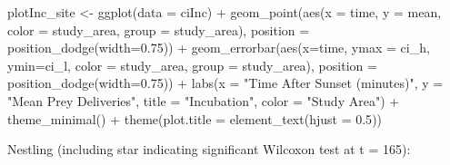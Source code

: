 \documentclass[
]{article}
\newenvironment{Shaded}{\begin{snugshade}}{\end{snugshade}}
\newcommand{\AttributeTok}[1]{\textcolor[rgb]{0.77,0.63,0.00}{#1}}
\newcommand{\FloatTok}[1]{\textcolor[rgb]{0.00,0.00,0.81}{#1}}
\newcommand{\FunctionTok}[1]{\textcolor[rgb]{0.00,0.00,0.00}{#1}}
\newcommand{\NormalTok}[1]{#1}
\newcommand{\OtherTok}[1]{\textcolor[rgb]{0.56,0.35,0.01}{#1}}
\newcommand{\SpecialCharTok}[1]{\textcolor[rgb]{0.00,0.00,0.00}{#1}}
\newcommand{\StringTok}[1]{\textcolor[rgb]{0.31,0.60,0.02}{#1}}
\begin{document}
\begin{Shaded}
\begin{Highlighting}[]
\NormalTok{plotInc\_site }\OtherTok{\textless{}{-}} \FunctionTok{ggplot}\NormalTok{(}\AttributeTok{data =}\NormalTok{ ciInc) }\SpecialCharTok{+}
  \FunctionTok{geom\_point}\NormalTok{(}\FunctionTok{aes}\NormalTok{(}\AttributeTok{x =}\NormalTok{ time, }\AttributeTok{y =}\NormalTok{ mean, }\AttributeTok{color =}\NormalTok{ study\_area, }\AttributeTok{group =}\NormalTok{ study\_area),}
             \AttributeTok{position =} \FunctionTok{position\_dodge}\NormalTok{(}\AttributeTok{width=}\FloatTok{0.75}\NormalTok{)) }\SpecialCharTok{+}
  \FunctionTok{geom\_errorbar}\NormalTok{(}\FunctionTok{aes}\NormalTok{(}\AttributeTok{x=}\NormalTok{time, }\AttributeTok{ymax =}\NormalTok{ ci\_h, }\AttributeTok{ymin=}\NormalTok{ci\_l, }\AttributeTok{color =}\NormalTok{ study\_area, }
                    \AttributeTok{group =}\NormalTok{ study\_area),}
                \AttributeTok{position =} \FunctionTok{position\_dodge}\NormalTok{(}\AttributeTok{width=}\FloatTok{0.75}\NormalTok{)) }\SpecialCharTok{+}
  \FunctionTok{labs}\NormalTok{(}\AttributeTok{x =} \StringTok{"Time After Sunset (minutes)"}\NormalTok{, }\AttributeTok{y =} \StringTok{"Mean Prey Deliveries"}\NormalTok{, }
       \AttributeTok{title =} \StringTok{"Incubation"}\NormalTok{, }\AttributeTok{color =} \StringTok{"Study Area"}\NormalTok{) }\SpecialCharTok{+}
  \FunctionTok{theme\_minimal}\NormalTok{() }\SpecialCharTok{+}
  \FunctionTok{theme}\NormalTok{(}\AttributeTok{plot.title =} \FunctionTok{element\_text}\NormalTok{(}\AttributeTok{hjust =} \FloatTok{0.5}\NormalTok{))}
\end{Highlighting}
\end{Shaded}

Nestling (including star indicating significant Wilcoxon test at t =
165):
\end{document}
